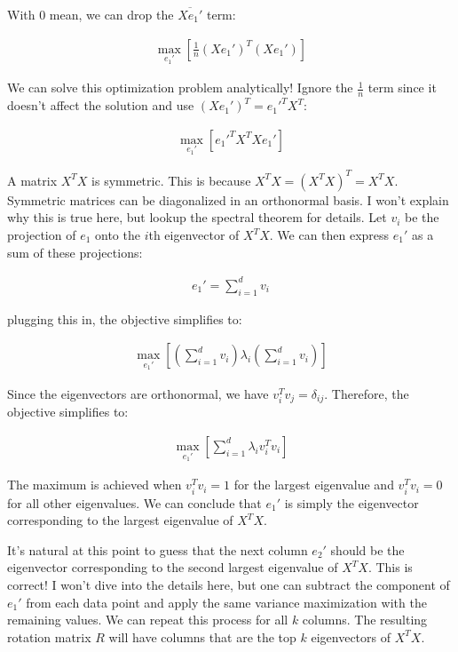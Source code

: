 \documentclass[12pt]{article}  %
\begin{document}
With 0 mean, we can drop the $\overline{Xe_1'}$ term:

\begin{align*}
    \max_{e_1'} \left[\frac{1}{n} (Xe_1')^T(Xe_1')\right]
\end{align*}

We can solve this optimization problem analytically! Ignore the $\frac{1}{n}$ term since it doesn't affect the solution and use $(Xe_1')^T = e_1'^TX^T$:

\begin{align*}
    \max_{e_1'} \left[e_1'^TX^TXe_1'\right]
\end{align*}

A matrix $X^TX$ is symmetric. This is because $X^TX = (X^TX)^T = X^TX$. Symmetric matrices can be diagonalized in an orthonormal basis. I won't explain why this is true here, but lookup the spectral theorem for details. Let $v_i$ be the projection of $e_1$ onto the $i$th eigenvector of $X^TX$. We can then express $e_1'$ as a sum of these projections:

\begin{align*}
    e_1' = \sum_{i = 1}^{d} v_i
\end{align*}

plugging this in, the objective simplifies to:

\begin{align*}
    \max_{e_1'} \left[\left(\sum_{i = 1}^{d} v_i\right) \lambda_i \left(\sum_{i = 1}^{d} v_i\right)\right]
\end{align*}

Since the eigenvectors are orthonormal, we have $v_i^Tv_j = \delta_{ij}$. Therefore, the objective simplifies to:

\begin{align*}
    \max_{e_1'} \left[\sum_{i = 1}^{d} \lambda_i v_i^Tv_i\right]
\end{align*}

The maximum is achieved when $v_i^Tv_i = 1$ for the largest eigenvalue and $v_i^Tv_i = 0$ for all other eigenvalues. We can conclude that $e_1'$ is simply the eigenvector corresponding to the largest eigenvalue of $X^TX$.

It's natural at this point to guess that the next column $e_2'$ should be the eigenvector corresponding to the second largest eigenvalue of $X^TX$. This is correct! I won't dive into the details here, but one can subtract the component of $e_1'$ from each data point and apply the same variance maximization with the remaining values. We can repeat this process for all $k$ columns. The resulting rotation matrix $R$ will have columns that are the top $k$ eigenvectors of $X^TX$.
\end{document}
